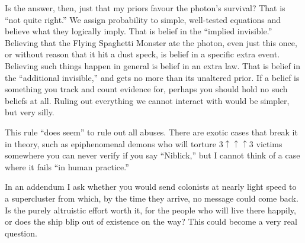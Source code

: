 Is the answer, then, just that my priors favour the photon's survival? That is ``not quite right.'' We assign probability to simple, well-tested equations and believe what they logically imply. That is belief in the ``implied invisible.'' Believing that the Flying Spaghetti Monster ate the photon, even just this once, or without reason that it hit a dust speck, is belief in a specific extra event. Believing such things happen in general is belief in an extra law. That is belief in the ``additional invisible,'' and gets no more than its unaltered prior. If a belief is something you track and count evidence for, perhaps you should hold no such beliefs at all. Ruling out everything we cannot interact with would be simpler, but very silly. 

This rule ``does seem'' to rule out all abuses. There are exotic cases that break it in theory, such as epiphenomenal demons who will torture $3\uparrow\uparrow\uparrow 3$ victims somewhere you can never verify if you say ``Niblick,'' but I cannot think of a case where it fails ``in human practice.''

In an addendum I ask whether you would send colonists at nearly light speed to a supercluster from which, by the time they arrive, no message could come back. Is the purely altruistic effort worth it, for the people who will live there happily, or does the ship blip out of existence on the way? This could become a very real question. 

